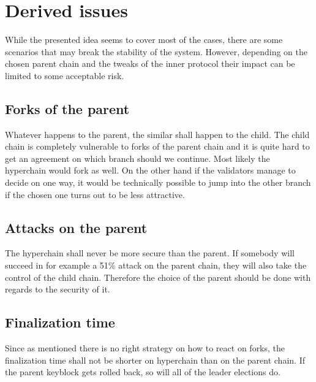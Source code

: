 \section{Derived issues}

While the presented idea seems to cover most of the cases, there are some
scenarios that may break the stability of the system. However, depending on the
chosen parent chain and the tweaks of the inner protocol their impact can be
limited to some acceptable risk.

\subsection{Forks of the parent}
Whatever happens to the parent, the similar shall happen to the child. The child
chain is completely vulnerable to forks of the parent chain and it is quite hard
to get an agreement on which branch should we continue. Most likely the
hyperchain would fork as well. On the other hand if the validators manage to
decide on one way, it would be technically possible to jump into the other
branch if the chosen one turns out to be less attractive.

\subsection{Attacks on the parent}

The hyperchain shall never be more secure than the parent. If somebody will
succeed in for example a 51\% attack on the parent chain, they will also take
the control of the child chain. Therefore the choice of the parent should be
done with regards to the security of it.

\subsection{Finalization time}

Since as mentioned there is no right strategy on how to react on forks, the
finalization time shall not be shorter on hyperchain than on the parent chain.
If the parent keyblock gets rolled back, so will all of the leader elections do.